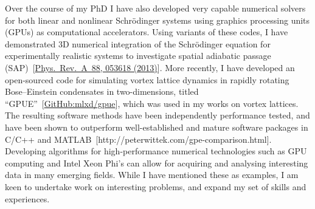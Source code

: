 \documentclass[12pt,a4paper,unicode]{moderncv}
\begin{document}
{    Over the course of my PhD I have also developed very capable numerical solvers for both linear and nonlinear Schr\"odinger systems using graphics processing units (GPUs) as computational accelerators. Using variants of these codes, I have demonstrated 3D numerical integration of the Schr\"odinger equation for experimentally realistic systems to investigate spatial adiabatic passage (SAP)~[\href{http://journals.aps.org/pra/abstract/10.1103/PhysRevA.88.053618}{Phys.~Rev.~A~88, 053618 (2013)}]. More recently, I have developed an open-sourced code for simulating vortex lattice dynamics in rapidly rotating Bose--Einstein condensates in two-dimensions, titled ``GPUE''~[\href{https://github.com/mlxd/gpue}{GitHub:mlxd/gpue}], which was used in my works on vortex lattices. The resulting software methods have been independently performance tested, and have been shown to outperform well-established and mature software packages in C/C++ and \textsc{MATLAB}~[http://peterwittek.com/gpe-comparison.html]. Developing algorithms for high-performance numerical technologies such as GPU computing and Intel Xeon Phi's can allow for acquiring and analysing interesting data in many emerging fields. While I have mentioned these as examples, I am keen to undertake work on interesting problems, and expand my set of skills and experiences.



}
\end{document}
